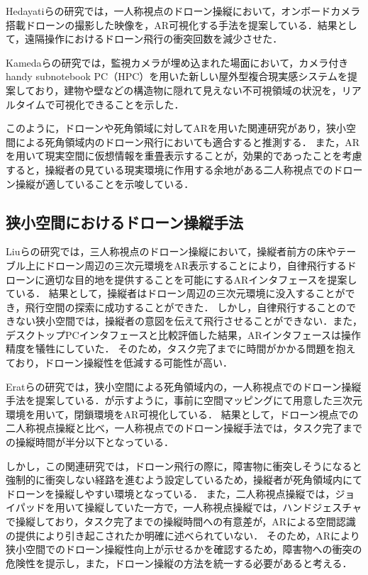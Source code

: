 \documentclass[submit, sigrecommended]{ipsj}
\begin{document}
Hedayatiらの研究\cite{book-ar02}では，一人称視点のドローン操縦において，オンボードカメラ搭載ドローンの撮影した映像を，AR可視化する手法を提案している．結果として，遠隔操作におけるドローン飛行の衝突回数を減少させた．

Kamedaらの研究\cite{book-ar03}では，監視カメラが埋め込まれた場面において，カメラ付きhandy subnotebook PC（HPC）を用いた新しい屋外型複合現実感システムを提案しており，建物や壁などの構造物に隠れて見えない不可視領域の状況を，リアルタイムで可視化できることを示した．

このように，ドローンや死角領域に対してARを用いた関連研究があり，狭小空間による死角領域内のドローン飛行においても適合すると推測する．
また，ARを用いて現実空間に仮想情報を重畳表示することが，効果的であったことを考慮すると，操縦者の見ている現実環境に作用する余地がある二人称視点でのドローン操縦が適していることを示唆している．

\subsection{狭小空間におけるドローン操縦手法}

Liuらの研究\cite{book-ar04}では，三人称視点のドローン操縦において，操縦者前方の床やテーブル上にドローン周辺の三次元環境をAR表示することにより，自律飛行するドローンに適切な目的地を提供することを可能にするARインタフェースを提案している．
結果として，操縦者はドローン周辺の三次元環境に没入することができ，飛行空間の探索に成功することができた．
しかし，自律飛行することのできない狭小空間では，操縦者の意図を伝えて飛行させることができない．また，デスクトップPCインタフェースと比較評価した結果，ARインタフェースは操作精度を犠牲にしていた．
そのため，タスク完了までに時間がかかる問題を抱えており，ドローン操縦性を低減する可能性が高い．

Eratらの研究\cite{article-ar05}では，狭小空間による死角領域内の，一人称視点でのドローン操縦手法を提案している．が示すように，事前に空間マッピングにて用意した三次元環境を用いて，閉鎖環境をAR可視化している．
結果として，ドローン視点での二人称視点操縦と比べ，一人称視点でのドローン操縦手法では，タスク完了までの操縦時間が半分以下となっている．

しかし，この関連研究では，ドローン飛行の際に，障害物に衝突しそうになると強制的に衝突しない経路を進むよう設定しているため，操縦者が死角領域内にてドローンを操縦しやすい環境となっている．
また，二人称視点操縦では，ジョイパッドを用いて操縦していた一方で，一人称視点操縦では，ハンドジェスチャで操縦しており，タスク完了までの操縦時間への有意差が，ARによる空間認識の提供により引き起こされたか明確に述べられていない．
そのため，ARにより狭小空間でのドローン操縦性向上が示せるかを確認するため，障害物への衝突の危険性を提示し，また，ドローン操縦の方法を統一する必要があると考える．
\end{document}
